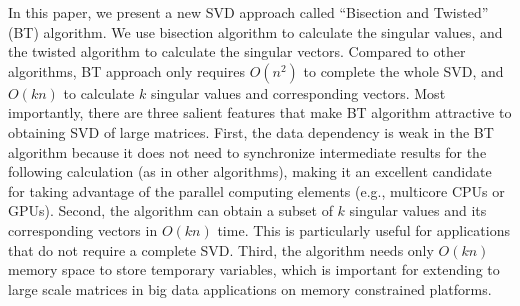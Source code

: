 
In this paper, we present a new SVD approach called ``Bisection and Twisted'' (BT) algorithm. We use bisection algorithm \cite{95ETNAbisecion} to calculate the singular values, and the twisted algorithm \cite{09NLAAtwisted} to calculate the singular vectors. %
Compared to other algorithms, BT approach only requires $O(n^2)$ to complete the whole SVD\cite{09NLAAtwisted,05UCB}, and $O(kn)$ to calculate $k$ singular values and corresponding vectors.
Most importantly, there are three salient features that make BT algorithm attractive
to obtaining SVD of large matrices. First, the data dependency is weak in the BT algorithm because it does not need to synchronize intermediate results for the following calculation (as in other algorithms),
making it an excellent candidate for taking advantage of the parallel computing
elements (e.g., multicore CPUs or GPUs). Second, 
the algorithm can obtain a subset of $k$ singular values and its corresponding vectors in $O(kn)$ time. This is particularly useful for applications that
do not require a complete SVD.
Third, the algorithm needs only $O(kn)$ memory space to store
temporary variables, which is important for extending to large scale
matrices in big data applications on memory constrained platforms.


